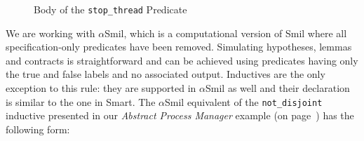 \documentclass[11pt]{article}
\def\slang{\textsf{Smart}}
\def\smil{\textsf{Smil}}
\newcommand{\disp}[1]{\lstinline&#1&}
\def\lbtrue{\textsf{true}}
\def\lbfalse{\textsf{false}}
\def\lbtrue{\textsf{true}}
\def\lbfalse{\textsf{false}}
\def\asmil{\textsf{$\alpha$Smil}}
\begin{document}
\begin{figure}[!h]
\begin{minipage}{18.5em}
{
}
\end{minipage}
\caption{Body of the \disp{stop_thread} Predicate}
\label{example:body}
\end{figure}
    
We are working with {\asmil}, which is a computational version of {\smil} where 
all specification-only predicates have been removed. Simulating hypotheses, 
lemmas and contracts is straightforward and can be achieved using predicates 
having only the {\lbtrue} and {\lbfalse} labels and no associated output. 
Inductives are the only exception to this rule: they are supported in {\asmil} 
as well and their declaration is similar to the one in {\slang}. The {\asmil} 
equivalent of the \disp{not_disjoint} inductive presented in our \emph{Abstract 
Process Manager} example (on page~\pageref{ch3:inductive:pred}) has the 
following form:
\end{document}
